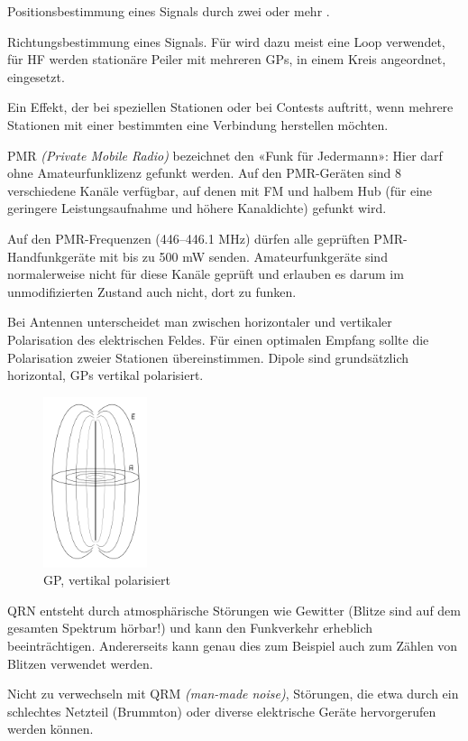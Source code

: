 {Positionsbestimmung eines Signals durch zwei oder mehr .}

{Richtungsbestimmung eines Signals. Für  wird dazu meist eine Loop verwendet, für HF werden stationäre Peiler mit mehreren GPs, in einem Kreis angeordnet, eingesetzt.}

{Ein Effekt, der bei speziellen Stationen oder bei Contests auftritt, wenn mehrere Stationen mit einer bestimmten eine Verbindung herstellen möchten.}

{PMR \textit{(Private Mobile Radio)} bezeichnet den «Funk für Jedermann»: Hier darf ohne Amateurfunklizenz gefunkt werden. Auf den PMR-Geräten sind 8 verschiedene Kanäle verfügbar, auf denen mit FM und halbem Hub (für eine geringere Leistungsaufnahme und höhere Kanaldichte) gefunkt wird.

Auf den PMR-Frequenzen (446–446.1 MHz) dürfen alle geprüften PMR-Handfunkgeräte mit bis zu 500 mW senden. Amateurfunkgeräte sind normalerweise nicht für diese Kanäle geprüft und erlauben es darum im unmodifizierten Zustand auch nicht, dort zu funken.}

{Bei Antennen unterscheidet man zwischen horizontaler und vertikaler Polarisation des elektrischen Feldes. Für einen optimalen Empfang sollte die Polarisation zweier Stationen übereinstimmen. Dipole sind grundsätzlich horizontal, GPs vertikal polarisiert.

\begin{figure}[h!]
 \centering
 \includegraphics[height=5cm]{./png/Amfu-Antenne-Polarisation.png}
 \caption{GP, vertikal polarisiert}
 \label{fig:polarisation}
\end{figure}

}

{QRN entsteht durch atmosphärische Störungen wie Gewitter (Blitze sind auf dem gesamten Spektrum hörbar!) und kann den Funkverkehr erheblich beeinträchtigen. Andererseits kann genau dies zum Beispiel auch zum Zählen von Blitzen verwendet werden.

Nicht zu verwechseln mit QRM \textit{(man-made noise)}, Störungen, die etwa durch ein schlechtes Netzteil (Brummton) oder diverse elektrische Geräte hervorgerufen werden können.}


